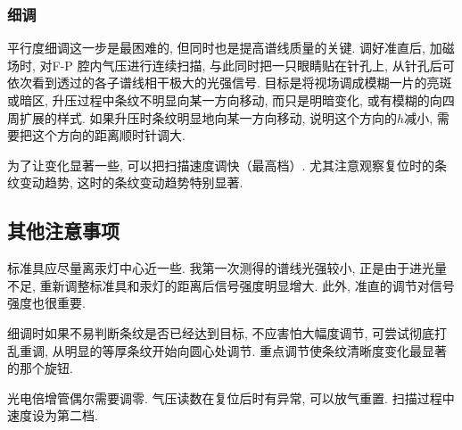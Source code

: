 \documentclass[aps,pre,12pt,preprint,onecolumn,showpacs,showkeys]{revtex4-1}
\begin{document}
\subsubsection{细调}
平行度细调这一步是最困难的, 但同时也是提高谱线质量的关键. 调好准直后, 加磁场时, 对F-P 腔内气压进行连续扫描, 与此同时把一只眼睛贴在针孔上, 从针孔后可依次看到透过的各子谱线相干极大的光强信号. 目标是将视场调成模糊一片的亮斑或暗区, 升压过程中条纹不明显向某一方向移动, 而只是明暗变化, 或有模糊的向四周扩展的样式. 如果升压时条纹明显地向某一方向移动, 说明这个方向的$h$减小, 需要把这个方向的距离顺时针调大. 

为了让变化显著一些, 可以把扫描速度调快（最高档）. 尤其注意观察复位时的条纹变动趋势, 这时的条纹变动趋势特别显著. 

\subsection{其他注意事项}
标准具应尽量离汞灯中心近一些. 我第一次测得的谱线光强较小, 正是由于进光量不足, 重新调整标准具和汞灯的距离后信号强度明显增大. 此外, 准直的调节对信号强度也很重要. 

细调时如果不易判断条纹是否已经达到目标, 不应害怕大幅度调节, 可尝试彻底打乱重调, 从明显的等厚条纹开始向圆心处调节. 重点调节使条纹清晰度变化最显著的那个旋钮. 

光电倍增管偶尔需要调零. 气压读数在复位后时有异常, 可以放气重置.  扫描过程中速度设为第二档. 
\end{document}
